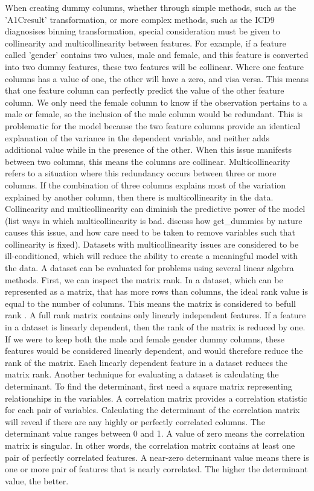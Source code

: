 \documentclass[sigconf]{acmart}
\begin{document}
When creating dummy columns, whether through simple methods, such as the 'A1Cresult' transformation, or more complex methods, such as the ICD9 diagnosises binning transformation, special consideration must be given to collinearity and multicollinearity between features. For example, if a feature called 'gender' contains two values, male and female, and this feature is converted into two dummy features, these two features will be collinear. Where one feature columns has a value of one, the other will have a zero, and visa versa. This means that one feature column can perfectly predict the value of the other feature column. We only need the female column to know if the observation pertains to a male or female, so the inclusion of the male column would be redundant. This is problematic for the model because the two feature columns provide an identical explanation of the variance in the dependent variable, and neither adds additional value while in the presence of the other. When this issue manifests between two columns, this means the columns are collinear. Multicollinearity refers to a situation where this redundancy occurs between three or more columns. If the combination of three columns explains most of the variation explained by another column, then there is multicollinearity in the data.
Collinearity and multicollinearity can diminish the predictive power of the model (list ways in which multicollinearity is bad. discuss how get\_dummies by nature causes this issue, and how care need to be taken to remove variables such that collinearity is fixed).
Datasets with multicollinearity issues are considered to be ill-conditioned, which will reduce the ability to create a meaningful model with the data. A dataset can be evaluated for problems using several linear algebra methods. First, we can inspect the matrix rank. In a dataset, which can be represented as a matrix, that has more rows than columns, the ideal rank value is equal to the number of columns. This means the matrix is considered to befull rank \cite{cite14}. A full rank matrix contains only linearly independent features. If a feature in a dataset is linearly dependent, then the rank of the matrix is reduced by one. If we were to keep both the male and female gender dummy columns, these features would be considered linearly dependent, and would therefore reduce the rank of the matrix. Each linearly dependent feature in a dataset reduces the matrix rank.
Another technique for evaluating a dataset is calculating the determinant. To find the determinant, first need a square matrix representing relationships in the variables. A correlation matrix provides a correlation statistic for each pair of variables. Calculating the determinant of the correlation matrix will reveal if there are any highly or perfectly correlated columns. The determinant value ranges between 0 and 1. A value of zero means the correlation matrix is singular. In other words, the correlation matrix contains at least one pair of perfectly correlated features. A near-zero determinant value means there is one or more pair of features that is nearly correlated. The higher the determinant value, the better.
\end{document}
